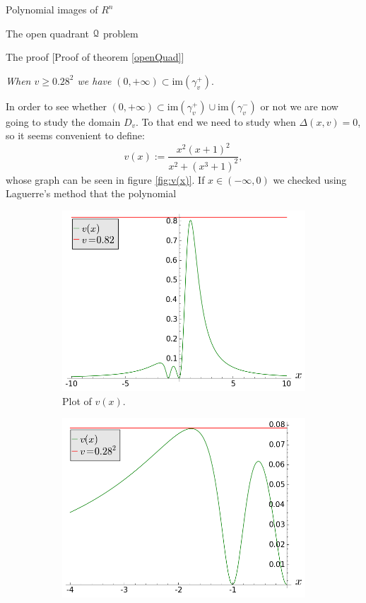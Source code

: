 \documentclass[11pt, a4paper, english, twoside, notitlepage, openright]{report}
\begin{document}
\begin{chapter}{Polynomial images of $R^n$}
\begin{section}{The open quadrant $\mathcal{Q}$ problem}
\begin{subsection}{The proof} [Proof of theorem \ref{openQuad}]
\begin{center}
 \emph{When $v\geq 0.28^2$ we have} $(0,+\infty)\subset\text{im}(\gamma_v^+)$.
\end{center}\label{step3}
In order to see whether $(0,+\infty)\subset\text{im}(\gamma_v^+)\cup\text{im}(\gamma_v^-)$ or not we are now going to study the domain $D_v$. To that end we need to study when $\Delta(x,v)=0$, so it seems convenient to define:
$$
v(x):=\frac{x^2(x+1)^2}{x^2+(x^3+1)^2},
$$
whose graph can be seen in figure \ref{fig:v(x)}. If $x\in(-\infty,0)$ we checked using Laguerre's method that the polynomial
\begin{figure}[h]\hspace{-1.75cm}
\begin{subfigure}{.6\linewidth}\centering
\includegraphics[width=1\textwidth]{plots/ch1_10_uve.png}
\caption{Plot of $v(x)$.\label{fig:uve}}
\end{subfigure}
\begin{subfigure}{.6\linewidth}\centering
\includegraphics[width=1\textwidth]{plots/ch1_11_uve_detail.png}

\end{subfigure}
\end{figure}
\end{subsection}
\end{section}
\end{chapter}
\end{document}
